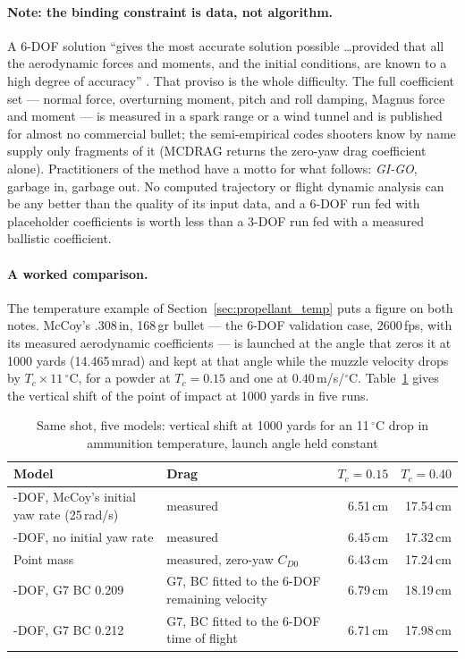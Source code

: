 \documentclass[11pt,twoside,openright]{report}
\begin{document}
\paragraph{Note: the binding constraint is data, not algorithm.} A 6-DOF solution ``gives the most accurate solution possible \dots provided that all the aerodynamic forces and moments, and the initial conditions, are known to a high degree of accuracy'' \citep{mccoy1999modern}. That proviso is the whole difficulty. The full coefficient set --- normal force, overturning moment, pitch and roll damping, Magnus force and moment --- is measured in a spark range or a wind tunnel and is published for almost no commercial bullet; the semi-empirical codes shooters know by name supply only fragments of it (MCDRAG returns the zero-yaw drag coefficient alone). Practitioners of the method have a motto for what follows: \emph{GI-GO}, garbage in, garbage out. No computed trajectory or flight dynamic analysis can be any better than the quality of its input data, and a 6-DOF run fed with placeholder coefficients is worth less than a 3-DOF run fed with a measured ballistic coefficient.

\paragraph{A worked comparison.} The temperature example of Section~\ref{sec:propellant_temp} puts a figure on both notes. McCoy's .308\,in, 168\,gr bullet --- the 6-DOF validation case, 2600\,fps, with its measured aerodynamic coefficients --- is launched at the angle that zeros it at 1000 yards (14.465\,mrad) and kept at that angle while the muzzle velocity drops by $T_c \times 11\,^\circ$C, for a powder at $T_c = 0.15$ and one at $0.40$\,m/s/$^\circ$C. Table~\ref{tab:model_comparison} gives the vertical shift of the point of impact at 1000 yards in five runs.

\begin{table}[H]
\centering
\caption{Same shot, five models: vertical shift at 1000 yards for an 11\,$^\circ$C drop in ammunition temperature, launch angle held constant}
\label{tab:model_comparison}
\footnotesize
\begin{tabularx}{\textwidth}{@{}>{\raggedright\arraybackslash}p{4.6cm}>{\raggedright\arraybackslash}Xrr@{}}
\toprule
\textbf{Model} & \textbf{Drag} & \textbf{$T_c = 0.15$} & \textbf{$T_c = 0.40$} \\
\midrule
6-DOF, McCoy's initial yaw rate (25\,rad/s) & measured & 6.51\,cm & 17.54\,cm \\
6-DOF, no initial yaw rate & measured & 6.45\,cm & 17.32\,cm \\
Point mass & measured, zero-yaw $C_{D0}$ & 6.43\,cm & 17.24\,cm \\
3-DOF, G7 BC 0.209 & G7, BC fitted to the 6-DOF remaining velocity & 6.79\,cm & 18.19\,cm \\
3-DOF, G7 BC 0.212 & G7, BC fitted to the 6-DOF time of flight & 6.71\,cm & 17.98\,cm \\
\bottomrule
\end{tabularx}
\end{table}
\end{document}
